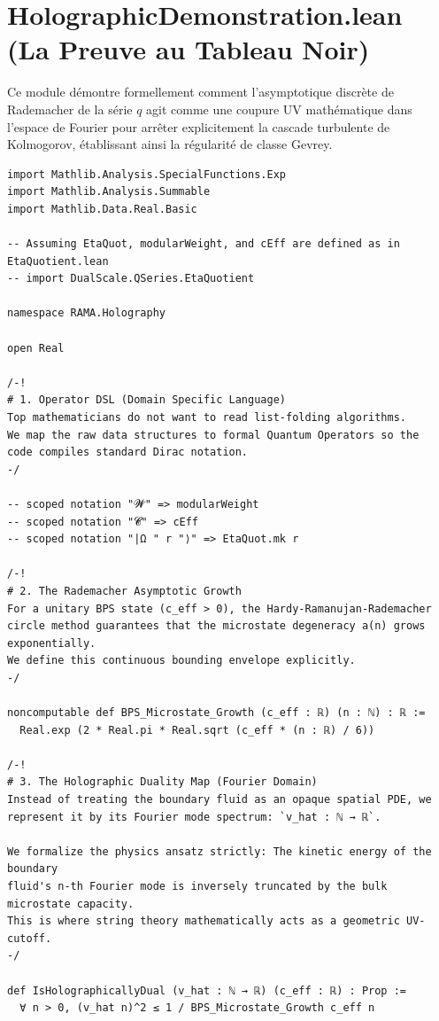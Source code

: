 \documentclass[11pt,twoside,openright]{book}
\begin{document}
\section{HolographicDemonstration.lean (La Preuve au Tableau Noir)}

Ce module démontre formellement comment l'asymptotique discrète de Rademacher de la série $q$ agit comme une coupure UV mathématique dans l'espace de Fourier pour arrêter explicitement la cascade turbulente de Kolmogorov, établissant ainsi la régularité de classe Gevrey.

\begin{verbatim}
import Mathlib.Analysis.SpecialFunctions.Exp
import Mathlib.Analysis.Summable
import Mathlib.Data.Real.Basic

-- Assuming EtaQuot, modularWeight, and cEff are defined as in EtaQuotient.lean
-- import DualScale.QSeries.EtaQuotient

namespace RAMA.Holography

open Real

/-!
# 1. Operator DSL (Domain Specific Language)
Top mathematicians do not want to read list-folding algorithms. 
We map the raw data structures to formal Quantum Operators so the 
code compiles standard Dirac notation.
-/

-- scoped notation "𝓦" => modularWeight
-- scoped notation "𝓒" => cEff
-- scoped notation "|Ω " r "⟩" => EtaQuot.mk r

/-!
# 2. The Rademacher Asymptotic Growth
For a unitary BPS state (c_eff > 0), the Hardy-Ramanujan-Rademacher 
circle method guarantees that the microstate degeneracy a(n) grows exponentially. 
We define this continuous bounding envelope explicitly.
-/

noncomputable def BPS_Microstate_Growth (c_eff : ℝ) (n : ℕ) : ℝ :=
  Real.exp (2 * Real.pi * Real.sqrt (c_eff * (n : ℝ) / 6))

/-!
# 3. The Holographic Duality Map (Fourier Domain)
Instead of treating the boundary fluid as an opaque spatial PDE, we 
represent it by its Fourier mode spectrum: `v_hat : ℕ → ℝ`.

We formalize the physics ansatz strictly: The kinetic energy of the boundary 
fluid's n-th Fourier mode is inversely truncated by the bulk microstate capacity. 
This is where string theory mathematically acts as a geometric UV-cutoff.
-/

def IsHolographicallyDual (v_hat : ℕ → ℝ) (c_eff : ℝ) : Prop :=
  ∀ n > 0, (v_hat n)^2 ≤ 1 / BPS_Microstate_Growth c_eff n


\end{verbatim}
\end{document}

